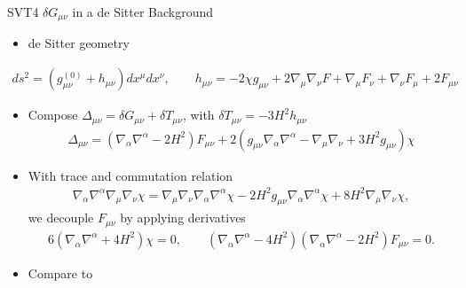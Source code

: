 \documentclass[8pt,aspectratio=1610]{beamer}
\begin{document}
\begin{frame}{SVT4 $\delta G_{\mu\nu}$ in a de Sitter Background}
	\begin{itemize}
		\item de Sitter geometry
	\end{itemize}
	\begin{eqnarray}
		ds^2 =(g_{\mu\nu}^{(0)} + h_{\mu\nu})dx^\mu dx^\nu,\qquad  h_{\mu\nu} = -2\chi g_{\mu\nu} + 2\nabla_\mu\nabla_\nu F + \nabla_\mu F_{\nu} + \nabla_\nu F_{\mu} + 2 F_{\mu\nu}
	\end{eqnarray}
	\begin{itemize}
		\item Compose $\Delta_{\mu\nu} = \delta G_{\mu\nu} + \delta T_{\mu\nu}$, with $\delta T_{\mu\nu} = -3 H^2 h_{\mu\nu}$
		\begin{eqnarray}
		\Delta_{\mu\nu}=(\nabla_{\alpha}\nabla^{\alpha}-2H^2)F_{\mu\nu}+2(g_{\mu\nu}\nabla_{\alpha}\nabla^{\alpha}-\nabla_{\mu}\nabla_{\nu}+3H^2g_{\mu\nu})\chi
		\end{eqnarray}
		\item With trace and commutation relation
		\begin{eqnarray}
		\nabla_{\alpha}\nabla^{\alpha}\nabla_{\mu}\nabla_{\nu}\chi=\nabla_{\mu}\nabla_{\nu}\nabla_{\alpha}\nabla^{\alpha}\chi
		-2H^2g_{\mu\nu}\nabla_{\alpha}\nabla^{\alpha}\chi
		+8H^2\nabla_{\mu}\nabla_{\nu}\chi,
		\end{eqnarray}
		we decouple $F_{\mu\nu}$ by applying derivatives
		\begin{eqnarray}
			6(\nabla_{\alpha}\nabla^{\alpha}+4H^2)\chi=0,\qquad 
			(\nabla_{\alpha}\nabla^{\alpha}-4H^2)(\nabla_{\alpha}\nabla^{\alpha}-2H^2)F_{\mu\nu}=0.
			\label{6.31a}
		\end{eqnarray}
		\item Compare to \hyperlink{svt3ds4}{}
	\end{itemize}
	
\end{frame}

\end{document}
